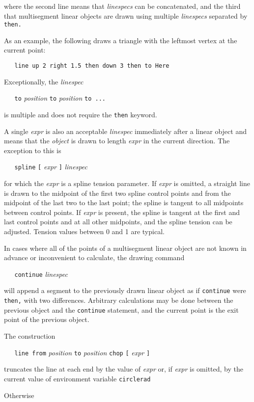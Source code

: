 where
the second line means that
{\it linespecs}
can be concatenated, and the third
that multisegment linear objects are drawn using multiple
{\it linespecs}
separated by
{\tt then.}

As an example, the following draws a triangle with the leftmost vertex
at the current point:

{\tt \ \ \ line\ up\ 2\ right\ 1.5\ then\ down\ 3\ then\ to\ Here}

Exceptionally, the
{\it linespec}

{\tt \ \ \ to}
{\it position}
{\tt to}
{\it position}
{\tt to\ ...}

is multiple and does not require the
{\tt then}
keyword.

A single
{\it expr}
is also an acceptable
{\it linespec}
immediately after a linear object and means that the
{\it object}
is drawn to length
{\it expr}
in the current direction.
The exception to this is

{\tt \ \ \ spline}
{\tt [}
{\it expr}
{\tt ]}
{\it linespec}

for which the
{\it expr}
is a spline tension parameter.
If
{\it expr}
is omitted, a straight line is drawn to the midpoint of the first two
spline control points and from the midpoint of the last two to the last
point; the spline is tangent to all midpoints between control points.
If
{\it expr}
is present, the spline is tangent at the first and last control points
and at all other midpoints, and the spline tension can be
adjusted.
Tension values between 0 and 1 are typical.

In cases where all of the points of a multisegment linear object are
not known in advance or inconvenient to calculate, the drawing command

{\tt \ \ \ continue}
{\it linespec}

will append a segment to the previously drawn linear object as if
{\tt continue}
were
{\tt then,}
with two differences.
Arbitrary calculations may be done between the previous object and the
{\tt continue}
statement, and the current point is the exit point of the previous object.

The construction

{\tt \ \ \ line\ from}
{\it position}
{\tt to}
{\it position}
{\tt chop}
{\tt [}
{\it expr}
{\tt ]}

truncates the line at each end by the value of
{\it expr}
or, if
{\it expr}
is omitted, by the current value of environment variable
{\tt circlerad}

Otherwise

